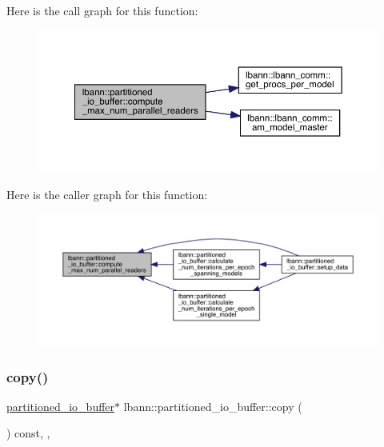 Here is the call graph for this function\+:\nopagebreak
\begin{figure}[H]
\begin{center}
\leavevmode
\includegraphics[width=350pt]{classlbann_1_1partitioned__io__buffer_a5048100fb7cdc13908ecba6b4415b977_cgraph}
\end{center}
\end{figure}
Here is the caller graph for this function\+:\nopagebreak
\begin{figure}[H]
\begin{center}
\leavevmode
\includegraphics[width=350pt]{classlbann_1_1partitioned__io__buffer_a5048100fb7cdc13908ecba6b4415b977_icgraph}
\end{center}
\end{figure}
\mbox{\label{classlbann_1_1partitioned__io__buffer_afce1a8859516dfaa482159806b75c263}} 
\subsubsection{\texorpdfstring{copy()}{copy()}}
{\footnotesize\ttfamily \hyperlink{classlbann_1_1partitioned__io__buffer}{partitioned\+\_\+io\+\_\+buffer}$\ast$ lbann\+::partitioned\+\_\+io\+\_\+buffer\+::copy (\begin{DoxyParamCaption}{ }\end{DoxyParamCaption}) const\hspace{0.3cm}{\ttfamily [inline]}, {\ttfamily [override]}, {\ttfamily [virtual]}}



